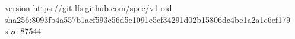 version https://git-lfs.github.com/spec/v1
oid sha256:8093fb4a557b1acf593c56d5e1091e5cf34291d02b15806dc4be1a2a1c6ef179
size 87544
